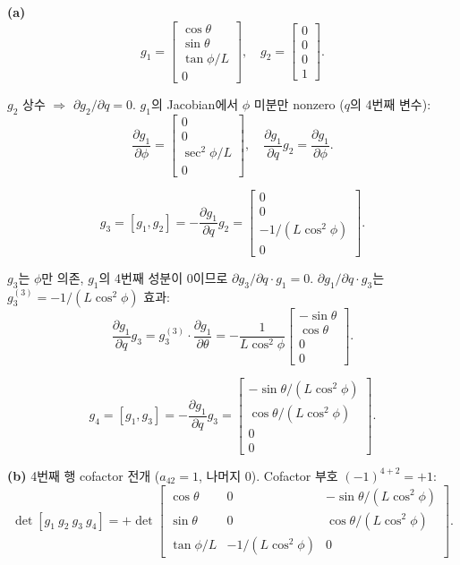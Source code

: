 \documentclass[11pt,a4paper]{article}
\begin{document}
\begin{sol}
\textbf{(a)}
\[
g_1 = \begin{bmatrix}\cos\theta\\\sin\theta\\\tan\phi/L\\0\end{bmatrix},\quad g_2 = \begin{bmatrix}0\\0\\0\\1\end{bmatrix}.
\]

$g_2$ 상수 $\Rightarrow$ $\partial g_2/\partial q = 0$. $g_1$의 Jacobian에서 $\phi$ 미분만 nonzero ($q$의 4번째 변수):
\[
\frac{\partial g_1}{\partial\phi} = \begin{bmatrix}0\\0\\\sec^2\phi/L\\0\end{bmatrix},\quad \frac{\partial g_1}{\partial q}g_2 = \frac{\partial g_1}{\partial\phi}.
\]

\[
\boxed{g_3 = [g_1, g_2] = -\frac{\partial g_1}{\partial q}g_2 = \begin{bmatrix}0\\0\\-1/(L\cos^2\phi)\\0\end{bmatrix}.}
\]

$g_3$는 $\phi$만 의존, $g_1$의 4번째 성분이 0이므로 $\partial g_3/\partial q \cdot g_1 = 0$. $\partial g_1/\partial q \cdot g_3$는 $g_3^{(3)} = -1/(L\cos^2\phi)$ 효과:
\[
\frac{\partial g_1}{\partial q}g_3 = g_3^{(3)} \cdot \frac{\partial g_1}{\partial\theta} = -\frac{1}{L\cos^2\phi}\begin{bmatrix}-\sin\theta\\\cos\theta\\0\\0\end{bmatrix}.
\]

\[
\boxed{g_4 = [g_1, g_3] = -\frac{\partial g_1}{\partial q}g_3 = \begin{bmatrix}-\sin\theta/(L\cos^2\phi)\\\cos\theta/(L\cos^2\phi)\\0\\0\end{bmatrix}.}
\]

\textbf{(b)} 4번째 행 cofactor 전개 ($a_{42} = 1$, 나머지 0). Cofactor 부호 $(-1)^{4+2} = +1$:
\[
\det[g_1\ g_2\ g_3\ g_4] = +\det\begin{bmatrix}\cos\theta & 0 & -\sin\theta/(L\cos^2\phi)\\\sin\theta & 0 & \cos\theta/(L\cos^2\phi)\\\tan\phi/L & -1/(L\cos^2\phi) & 0\end{bmatrix}.
\]


\end{sol}
\end{document}

